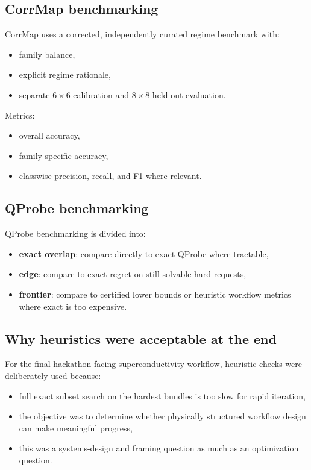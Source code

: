 \documentclass[11pt]{article}
\begin{document}
\subsection{CorrMap benchmarking}

CorrMap uses a corrected, independently curated regime benchmark with:

\begin{itemize}
\item family balance,
\item explicit regime rationale,
\item separate \(6\times 6\) calibration and \(8\times 8\) held-out evaluation.
\end{itemize}

Metrics:

\begin{itemize}
\item overall accuracy,
\item family-specific accuracy,
\item classwise precision, recall, and F1 where relevant.
\end{itemize}

\subsection{QProbe benchmarking}

QProbe benchmarking is divided into:

\begin{itemize}
\item \textbf{exact overlap}: compare directly to exact QProbe where tractable,
\item \textbf{edge}: compare to exact regret on still-solvable hard requests,
\item \textbf{frontier}: compare to certified lower bounds or heuristic workflow metrics where exact is too expensive.
\end{itemize}

\subsection{Why heuristics were acceptable at the end}

For the final hackathon-facing superconductivity workflow, heuristic checks were deliberately used because:

\begin{itemize}
\item full exact subset search on the hardest bundles is too slow for rapid iteration,
\item the objective was to determine whether physically structured workflow design can make meaningful progress,
\item this was a systems-design and framing question as much as an optimization question.
\end{itemize}
\end{document}
